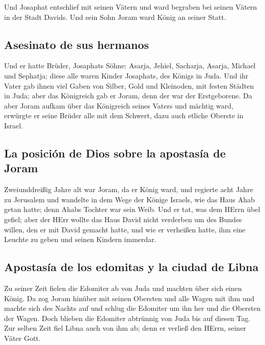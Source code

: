  Und Josaphat entschlief mit seinen Vätern und ward
begraben bei seinen Vätern in der Stadt Davids. Und sein Sohn Joram ward
König an seiner Statt.

\hypertarget{asesinato-de-sus-hermanos}{%
\subsection{Asesinato de sus hermanos}\label{asesinato-de-sus-hermanos}}

 Und er hatte Brüder, Josaphats Söhne: Asarja, Jehiel,
Sacharja, Asarja, Michael und Sephatja; diese alle waren Kinder
Josaphats, des Königs in Juda.  Und ihr Vater gab ihnen
viel Gaben von Silber, Gold und Kleinoden, mit festen Städten in Juda;
aber das Königreich gab er Joram, denn der war der Erstgeborene.
 Da aber Joram aufkam über das Königreich seines Vaters
und mächtig ward, erwürgte er seine Brüder alle mit dem Schwert, dazu
auch etliche Oberste in Israel.

\hypertarget{la-posiciuxf3n-de-dios-sobre-la-apostasuxeda-de-joram}{%
\subsection{La posición de Dios sobre la apostasía de
Joram}\label{la-posiciuxf3n-de-dios-sobre-la-apostasuxeda-de-joram}}

 Zweiunddreißig Jahre alt war Joram, da er König ward, und
regierte acht Jahre zu Jerusalem  und wandelte in dem Wege
der Könige Israels, wie das Haus Ahab getan hatte; denn Ahabs Tochter
war sein Weib. Und er tat, was dem HErrn übel gefiel; 
aber der HErr wollte das Haus David nicht verderben um des Bundes
willen, den er mit David gemacht hatte, und wie er verheißen hatte, ihm
eine Leuchte zu geben und seinen Kindern immerdar.

\hypertarget{apostasuxeda-de-los-edomitas-y-la-ciudad-de-libna}{%
\subsection{Apostasía de los edomitas y la ciudad de
Libna}\label{apostasuxeda-de-los-edomitas-y-la-ciudad-de-libna}}

 Zu seiner Zeit fielen die Edomiter ab von Juda und
machten über sich einen König.  Da zog Joram hinüber mit
seinen Obersten und alle Wagen mit ihm und machte sich des Nachts auf
und schlug die Edomiter um ihn her und die Obersten der Wagen.
 Doch blieben die Edomiter abtrünnig von Juda bis auf
diesen Tag. Zur selben Zeit fiel Libna auch von ihm ab; denn er verließ
den HErrn, seiner Väter Gott.

